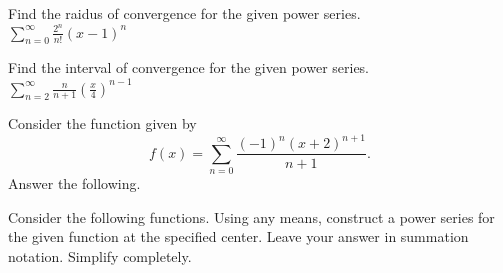 \documentclass[addpoints]{exam}
\begin{document}
\begin{questions}

\question[5] Find the raidus of convergence for the given power series.\\ $\displaystyle\sum_{n=0}^\infty \frac{2^n}{n!}(x-1)^n$


\question[10] Find the interval of convergence for the given power series.\\ $\displaystyle\sum_{n=2}^\infty \frac{n}{n+1}\left(\frac{x}{4}\right)^{n-1}$


\newpage

\question[15] Consider the function given by
\[f(x)=\sum_{n=0}^\infty\frac{(-1)^n (x+2)^{n+1}}{n+1}.\]
Answer the following.

\newpage

\question[30] Consider the following functions. Using any means, construct a power series for the given function at the specified center. Leave your answer in summation notation. Simplify completely.


\end{questions}
\end{document}
